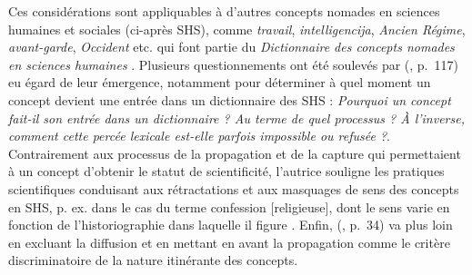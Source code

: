 Ces considérations sont appliquables à d'autres \og{}concepts nomades\fg{} en sciences humaines et sociales (ci-après \textsc{SHS}), comme \textit{travail}, \textit{intelligencija}, \textit{Ancien Régime}, \textit{avant-garde}, \textit{Occident} etc. qui font partie du \textit{Dictionnaire des concepts nomades en sciences humaines} \citep{christin2011dictionnaire}. Plusieurs questionnements ont été soulevés par \citeauthor{ghermani2011} (\citeyear{ghermani2011}, p.~117) eu égard de leur émergence, notamment pour déterminer à quel moment un concept devient une entrée dans un dictionnaire des \textsc{SHS} : \og{}\textit{Pourquoi un concept fait-il son entrée dans un dictionnaire ? Au terme de quel processus ? À l'inverse, comment cette percée lexicale est-elle parfois impossible ou refusée ?}\fg{}. Contrairement aux processus de la propagation et de la capture qui permettaient à un concept d'obtenir le statut de scientificité, l'autrice souligne les pratiques scientifiques conduisant aux rétractations et aux masquages de sens des concepts en \textsc{SHS}, p. ex. dans le cas du terme \og{}confession [religieuse]\fg{}, dont le sens varie en fonction de l'historiographie dans laquelle il figure \citep[p.~117]{ghermani2011}. Enfin, \citeauthor{bal2002travelling} (\citeyear{bal2002travelling}, p.~34) va plus loin en excluant la \og diffusion \fg{} et en mettant en avant la \og propagation \fg{} comme le critère discriminatoire de la nature itinérante des concepts. 

